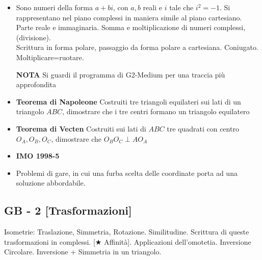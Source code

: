 \begin{itemize}
\item Sono numeri della forma $a+bi$, con $a,b$ reali e $i$ tale che $i^2=-1$. Si rappresentano nel piano complessi in maniera simile al piano cartesiano. Parte reale e immaginaria. Somma e moltiplicazione di numeri complessi, (divisione).\\
Scrittura in forma polare, passaggio da forma polare a cartesiana. Coniugato. Moltiplicare=ruotare. 

\textbf{NOTA} Si guardi il programma di G2-Medium per una traccia più approfondita

\item \textbf{Teorema di Napoleone} Costruiti tre triangoli equilateri sui lati di un triangolo $ABC$, dimostrare che i tre centri formano un triangolo equilatero

\item \textbf{Teorema di Vecten} Costruiti sui lati di $ABC$ tre quadrati con centro $O_A,O_B,O_C$, dimostrare che $O_BO_C\perp AO_A$

\item \textbf{IMO 1998-5}


\item Problemi di gare, in cui una furba scelta delle coordinate porta ad una soluzione abbordabile.
\end{itemize}








\subsection{GB - 2 [Trasformazioni]}


\begin{short}
Isometrie: Traslazione, Simmetria, Rotazione. Similitudine. Scrittura di queste trasformazioni in complessi. [$\bigstar$ Affinità]. Applicazioni dell'omotetia. 
Inversione Circolare. Inversione + Simmetria in un triangolo.
\end{short}

